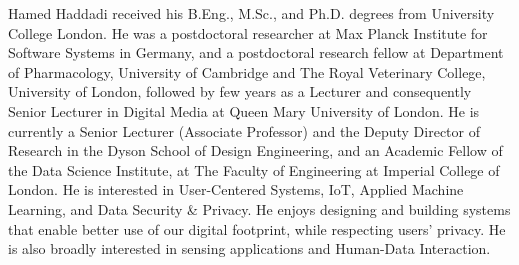 \documentclass[10pt,journal,compsoc]{IEEEtran}
\begin{document}
\begin{IEEEbiography}{Hamed Haddadi}
received his B.Eng., M.Sc., and Ph.D. degrees from University College London. He was a postdoctoral researcher at Max Planck Institute for Software Systems in Germany, and a postdoctoral research fellow at Department of Pharmacology, University of Cambridge and The Royal Veterinary College, University of London, followed by few years as a Lecturer and consequently Senior Lecturer in Digital Media at Queen Mary University of London. He is currently a Senior Lecturer (Associate Professor) and the Deputy Director of Research in the Dyson School of Design Engineering, and an Academic Fellow of the Data Science Institute, at The Faculty of Engineering at Imperial College of London. He is interested in User-Centered Systems, IoT, Applied Machine Learning, and Data Security \& Privacy. He enjoys designing and building systems that enable better use of our digital footprint, while respecting users' privacy. He is also broadly interested in sensing applications and Human-Data Interaction. 
\end{IEEEbiography}
\end{document}
